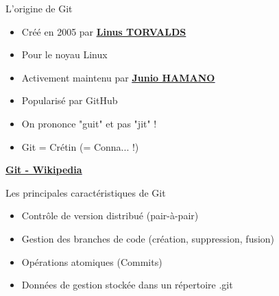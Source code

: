 \documentclass[a4paper,11pt]{beamer}
\begin{document}
\begin{frame}
    \begin{block}{L'origine de Git}
     \begin{itemize}
            \item Créé en 2005 par \textcolor{blue}{\textbf{\underline{\href{https://fr.wikipedia.org/wiki/Linus_Torvalds}{Linus TORVALDS}}}}
            \item Pour le noyau Linux
            \item Activement maintenu par \textcolor{blue}{\textbf{\underline{\href{https://simple.wikipedia.org/wiki/Junio_Hamano}{Junio HAMANO}}}}
            \item Popularisé par GitHub
            \item On prononce "guit" et pas "jit" !
            \item Git = Crétin (= Conna... !)                        
        \end{itemize}
    \end{block}
    \centering
\textcolor{blue}{\textbf{\underline{\href{https://fr.wikipedia.org/wiki/Git}{Git - Wikipedia}}}}
\end{frame}

\begin{frame}
    \begin{block}{Les principales caractéristiques de Git}
     \begin{itemize}
            \item Contrôle de version distribué (pair-à-pair)
            \item Gestion des branches de code (création, suppression, fusion)
            \item Opérations atomiques (Commits)
            \item Données de gestion stockée dans un répertoire .git 
        \end{itemize}
    \end{block}
\end{frame}
\end{document}
